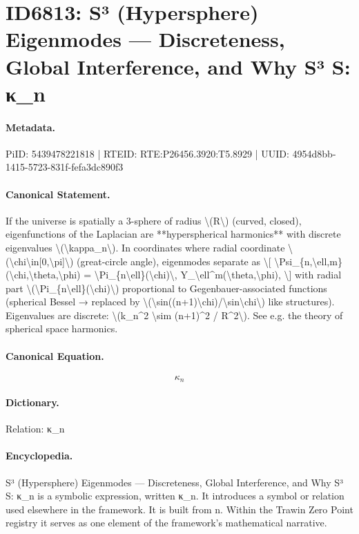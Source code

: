 \section*{ID6813: S³ (Hypersphere) Eigenmodes — Discreteness, Global Interference, and Why S³ S: κ\_n}
\paragraph{Metadata.}
PiID: 5439478221818 | RTEID: RTE:P26456.3920:T5.8929 | UUID: 4954d8bb-1415-5723-831f-fefa3dc890f3

\paragraph{Canonical Statement.}
If the universe is spatially a 3-sphere of radius \textbackslash{}(R\textbackslash{}) (curved, closed), eigenfunctions of the Laplacian are **hyperspherical harmonics** with discrete eigenvalues \textbackslash{}(\textbackslash{}kappa\_n\textbackslash{}). In coordinates where radial coordinate \textbackslash{}(\textbackslash{}chi\textbackslash{}in[0,\textbackslash{}pi]\textbackslash{}) (great-circle angle), eigenmodes separate as \textbackslash{}[ \textbackslash{}Psi\_\{n,\textbackslash{}ell,m\}(\textbackslash{}chi,\textbackslash{}theta,\textbackslash{}phi) = \textbackslash{}Pi\_\{n\textbackslash{}ell\}(\textbackslash{}chi)\textbackslash{}, Y\_\textbackslash{}ell\textasciicircum{}m(\textbackslash{}theta,\textbackslash{}phi), \textbackslash{}] with radial part \textbackslash{}(\textbackslash{}Pi\_\{n\textbackslash{}ell\}(\textbackslash{}chi)\textbackslash{}) proportional to Gegenbauer-associated functions (spherical Bessel → replaced by \textbackslash{}(\textbackslash{}sin((n+1)\textbackslash{}chi)/\textbackslash{}sin\textbackslash{}chi\textbackslash{}) like structures). Eigenvalues are discrete: \textbackslash{}(k\_n\textasciicircum{}2 \textbackslash{}sim (n+1)\textasciicircum{}2 / R\textasciicircum{}2\textbackslash{}). See e.g. the theory of spherical space harmonics.

\paragraph{Canonical Equation.}
\[
\kappa_n
\]

\paragraph{Dictionary.}
Relation: κ\_n

\paragraph{Encyclopedia.}
S³ (Hypersphere) Eigenmodes — Discreteness, Global Interference, and Why S³ S: κ\_n is a symbolic expression, written κ\_n. It introduces a symbol or relation used elsewhere in the framework. It is built from n. Within the Trawin Zero Point registry it serves as one element of the framework's mathematical narrative.
